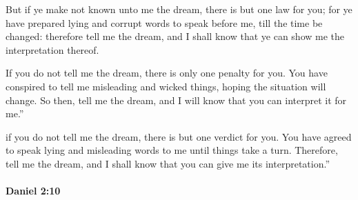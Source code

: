 			\begin{versebox}
					\item[BHS] 
					\item[LXX] 
					\item[ASV] But if ye make not known unto me the dream, there is but one law for you; for ye have prepared lying and corrupt words to speak before me, till the time be changed: therefore tell me the dream, and I shall know that ye can show me the interpretation thereof.
					\item[NIV] If you do not tell me the dream, there is only one penalty for you. You have conspired to tell me misleading and wicked things, hoping the situation will change. So then, tell me the dream, and I will know that you can interpret it for me.”
					\item[NRSV] if you do not tell me the dream, there is but one verdict for you. You have agreed to speak lying and misleading words to me until things take a turn. Therefore, tell me the dream, and I shall know that you can give me its interpretation.”
			\end{versebox}

		\paragraph{Daniel 2:10} %
			\label{DANIEL-2-10}

